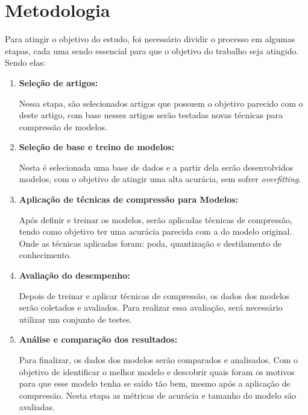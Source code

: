 \section{Metodologia}
Para atingir o objetivo do estudo, foi necessário dividir o processo em algumas etapas, cada uma sendo
essencial para que o objetivo do trabalho seja atingido. Sendo elas:

\begin{enumerate}
	\item \textbf{Seleção de artigos:}

		Nessa etapa, são selecionados artigos que possuem o objetivo parecido com o deste artigo,
		com base nesses artigos serão testadas novas técnicas para compressão de modelos.

	\item \textbf{Seleção de base e treino de modelos:}

		Nesta é selecionada uma base de dados e a partir dela serão desenvolvidos modelos,
		com o objetivo de atingir uma alta acurácia, sem sofrer \textit{overfitting}.

	\item \textbf{Aplicação de técnicas de compressão para Modelos:}

		Após definir e treinar os modelos, serão aplicadas técnicas de compressão, tendo como
		objetivo ter uma acurácia parecida com a do modelo original. Onde as técnicas aplicadas
		foram: poda, quantização e destilamento de conhecimento.

	\item \textbf{Avaliação do desempenho:}

		Depois de treinar e aplicar técnicas de compressão, os dados dos modelos serão coletados e
		avaliados. Para realizar essa avaliação, será necessário utilizar um conjunto de testes.

	\item \textbf{Análise e comparação dos resultados:}

		Para finalizar, os dados dos modelos serão comparados e analisados. Com o objetivo de
		identificar o melhor modelo e descobrir quais foram os motivos para que esse modelo tenha se
		saído tão bem, mesmo após a aplicação de compressão. Nesta etapa as métricas de acurácia e
		tamanho do modelo são avaliadas.

\end{enumerate}

